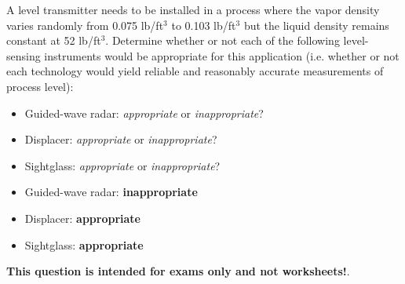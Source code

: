 

A level transmitter needs to be installed in a process where the vapor density varies randomly from 0.075 lb/ft$^{3}$ to 0.103 lb/ft$^{3}$ but the liquid density remains constant at 52 lb/ft$^{3}$.  Determine whether or not each of the following level-sensing instruments would be appropriate for this application (i.e. whether or not each technology would yield reliable and reasonably accurate measurements of process level):

\begin{itemize}
\item{} Guided-wave radar: {\it appropriate} or {\it inappropriate}?
\vskip 10pt
\item{} Displacer: {\it appropriate} or {\it inappropriate}?
\vskip 10pt
\item{} Sightglass: {\it appropriate} or {\it inappropriate}?
\end{itemize}







\begin{itemize}
\item{} Guided-wave radar: {\bf inappropriate}
\vskip 10pt
\item{} Displacer: {\bf appropriate}
\vskip 10pt
\item{} Sightglass: {\bf appropriate}
\end{itemize}







{\bf This question is intended for exams only and not worksheets!}.



